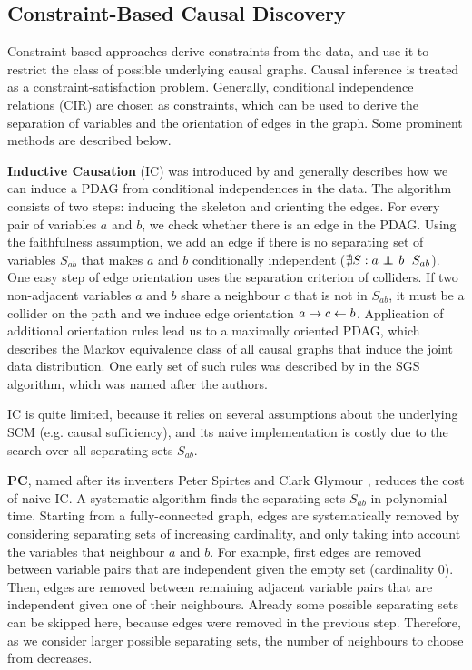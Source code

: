 \subsection*{Constraint-Based Causal Discovery}
Constraint-based approaches derive constraints from the data, and use it to restrict the class of possible underlying causal graphs. Causal inference is treated as a constraint-satisfaction problem. Generally, conditional independence relations (CIR) are chosen as constraints, which can be used to derive the separation of variables and the orientation of edges in the graph. Some prominent methods are described below.

\textbf{Inductive Causation} (IC) was introduced by \citet{verma1991equivalence} and generally describes how we can induce a PDAG from conditional independences in the data. The algorithm consists of two steps: inducing the skeleton and orienting the edges. For every pair of variables $a$ and $b$, we check whether there is an edge in the PDAG. Using the faithfulness assumption, we add an edge if there is no separating set of variables $S_{ab}$ that makes $a$ and $b$ conditionally independent ($\nexists S : {a} \operatorname*{{\,\perp\mkern-12mu\perp\,}}_{} {b} \,|\, {S_{ab}}$). One easy step of edge orientation uses the separation criterion of colliders. If two non-adjacent variables $a$ and $b$ share a neighbour $c$ that is not in $S_{ab}$, it must be a collider on the path and we induce edge orientation $a\to c \leftarrow b$. Application of additional orientation rules lead us to a maximally oriented PDAG, which describes the Markov equivalence class of all causal graphs that induce the joint data distribution. One early set of such rules was described by \citet{spirtes2000causation} in the SGS algorithm, which was named after the authors.
            
IC is quite limited, because it relies on several assumptions about the underlying SCM (e.g. causal sufficiency), and its naive implementation is costly due to the search over all separating sets $S_{ab}$.

\textbf{PC}, named after its inventers Peter Spirtes and Clark Glymour \citep{spirtes1991algorithm}, reduces the cost of naive IC. A systematic algorithm finds the separating sets $S_{ab}$ in polynomial time. Starting from a fully-connected graph, edges are systematically removed by considering separating sets of increasing cardinality, and only taking into account the variables that neighbour $a$ and $b$. For example, first edges are removed between variable pairs that are independent given the empty set (cardinality 0). Then, edges are removed between remaining adjacent variable pairs that are independent given one of their neighbours. Already some possible separating sets can be skipped here, because edges were removed in the previous step. Therefore, as we consider larger possible separating sets, the number of neighbours to choose from decreases.
            
